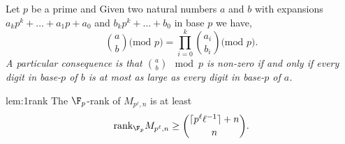 \begin{thm}\label{thm:luc}
Let $p$ be a prime and Given two natural numbers $a$ and $b$ with expansions $a_k p^k+\hdots+a_1p+a_0$ and  
$b_kp^k+\hdots+b_0$ in base $p$ we have,
\em{$$\binom{a}{b} \text{(mod }p\text{)}=\prod\limits_{i=0}^k\binom{a_i}{b_i} \text{(mod }p\text{)} .$$}
A particular consequence is that $\binom{a}{b} \mod p$ is non-zero if and only if every digit in base-$p$ of $b$ is at most as large as every digit in base-$p$ of $a$.
\end{thm}

\begin{replem}{lem:1rank}
The $\F_p$-rank of $M_{p^\ell,n}$ is at least 
{\em $$\text{rank}_{\F_p} M_{p^\ell,n} \ge \binom{\lceil p^\ell \ell^{-1}\rceil +n}{n}.$$}
\end{replem}

